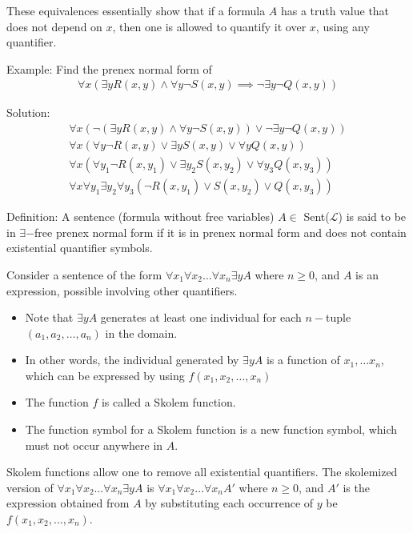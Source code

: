 \documentclass{article}
\begin{document}
These equivalences essentially show that if a formula $A$ has a truth value that does not depend on $x$, then one is allowed to quantify it over $x$, using any quantifier.

Example: Find the prenex normal form of
\begin{align*}
\forall x (\exists y R(x,y) \wedge \forall y \neg S(x,y) \implies \neg \exists y \neg Q(x,y))
\end{align*}

Solution:
\begin{align*}
\forall x (\neg (\exists y R(x,y) \wedge \forall y \neg S(x,y)) \vee \neg \exists y \neg Q(x,y)) \\
\forall x (\forall y \neg R(x,y) \vee \exists y S(x,y) \vee \forall y Q(x,y)) \\
\forall x (\forall y_1 \neg R(x,y_1) \vee \exists y_2 S(x,y_2) \vee \forall y_3 Q(x,y_3)) \\
\forall x \forall y_1 \exists y_2 \forall y_3 (\neg R(x,y_1) \vee S(x,y_2) \vee Q(x,y_3))
\end{align*}

Definition: A sentence (formula without free variables) $A \in $ Sent($\mathcal{L}$) is said to be in $\exists-$free prenex normal form if it is in prenex normal form and does not contain existential quantifier symbols.

Consider a sentence of the form $\forall x_1 \forall x_2 \ldots \forall x_n \exists y A$ where $n \ge 0$, and $A$ is an expression, possible involving other quantifiers.
\begin{itemize}
    \item Note that $\exists y A$ generates at least one individual for each $n-$tuple $(a_1, a_2, \ldots, a_n)$ in the domain.
    \item In other words, the individual generated by $\exists y A$ is a function of $x_1, \ldots x_n$, which can be expressed by using $f(x_1, x_2, \ldots, x_n)$
    \item The function $f$ is called a Skolem function.
    \item The function symbol for a Skolem function is a new function symbol, which must not occur anywhere in $A$.
\end{itemize}

Skolem functions allow one to remove all existential quantifiers. The skolemized version of $\forall x_1 \forall x_2 \ldots \forall x_n \exists y A$ is $\forall x_1 \forall x_2 \ldots \forall x_n A'$ where $n \ge 0$, and $A'$ is the expression obtained from $A$ by substituting each occurrence of $y$ be $f(x_1, x_2, \ldots, x_n)$.
\end{document}
